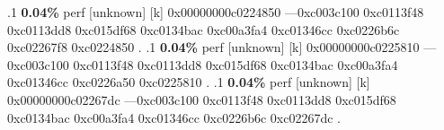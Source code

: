 \begin{profile}
{.1 \textbf{ 0.04\%} perf             [unknown]              [k] 0x00000000c0224850\newline {} ---0xc003c100\newline {} 0xc0113f48\newline {} 0xc0113dd8\newline {} 0xc015df68\newline {} 0xc0134bac\newline {} 0xc00a3fa4\newline {} 0xc01346cc\newline {} 0xc0226b6c\newline {} 0xc02267f8\newline {} 0xc0224850\newline {} . 
.1 \textbf{ 0.04\%} perf             [unknown]              [k] 0x00000000c0225810\newline {} ---0xc003c100\newline {} 0xc0113f48\newline {} 0xc0113dd8\newline {} 0xc015df68\newline {} 0xc0134bac\newline {} 0xc00a3fa4\newline {} 0xc01346cc\newline {} 0xc0226a50\newline {} 0xc0225810\newline {} . 
.1 \textbf{ 0.04\%} perf             [unknown]              [k] 0x00000000c02267dc\newline {} ---0xc003c100\newline {} 0xc0113f48\newline {} 0xc0113dd8\newline {} 0xc015df68\newline {} 0xc0134bac\newline {} 0xc00a3fa4\newline {} 0xc01346cc\newline {} 0xc0226b6c\newline {} 0xc02267dc\newline {} . 
}
\end{profile}
